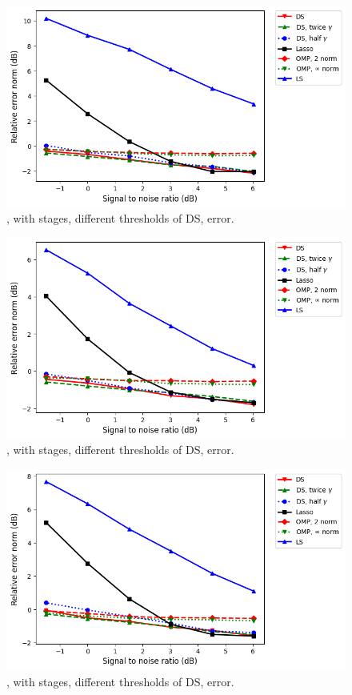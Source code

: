 %
\begin {figure} [H]
\includegraphics [width = \textwidth] {error-medium-more-square-six-ddss.png}
\caption {, with  stages, different thresholds of DS, error.}
\end {figure}
%
\begin {figure} [H]
\includegraphics [width = \textwidth] {error-medium-more-wide-six-ddss.png}
\caption {, with  stages, different thresholds of DS, error.}
\end {figure}
%
\begin {figure} [H]
\includegraphics [width = \textwidth] {error-medium-more-tall-six-ddss.png}
\caption {, with  stages, different thresholds of DS, error.}
\end {figure}

